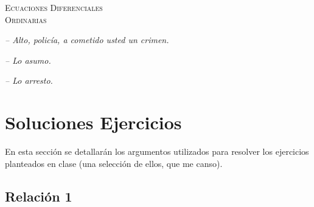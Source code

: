 \documentclass{article}
\begin{document}
\begin{titlepage}
    \begin{center}
        {\Huge \textsc{Ecuaciones Diferenciales \\ \vspace{10px} Ordinarias}}
    \end{center}

    \vspace{10px}

    \hfill{\textit{-- Alto, policía, a cometido usted un crimen.}}

    \hfill{\textit{-- Lo asumo.}}

    \hfill{\textit{-- Lo arresto.}}

    \tableofcontents
\end{titlepage}

\newpage

\section{Soluciones Ejercicios}

En esta sección se detallarán los argumentos utilizados para resolver los ejercicios planteados en clase (una selección de ellos, que me canso).

\subsection{Relación 1}
\label{seq:1:1}
\end{document}
